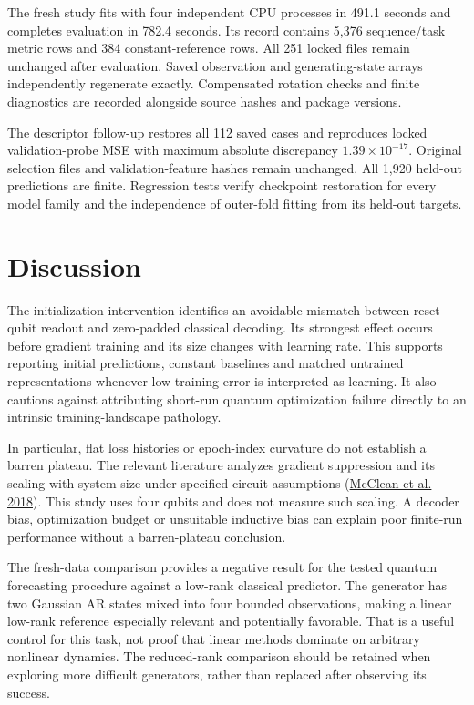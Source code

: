 \documentclass[
  11pt,
]{article}
\begin{document}
The fresh study fits with four independent CPU processes in 491.1
seconds and completes evaluation in 782.4 seconds. Its record contains
5,376 sequence/task metric rows and 384 constant-reference rows. All 251
locked files remain unchanged after evaluation. Saved observation and
generating-state arrays independently regenerate exactly. Compensated
rotation checks and finite diagnostics are recorded alongside source
hashes and package versions.

The descriptor follow-up restores all 112 saved cases and reproduces
locked validation-probe MSE with maximum absolute discrepancy
\(1.39\times10^{-17}\). Original selection files and validation-feature
hashes remain unchanged. All 1,920 held-out predictions are finite.
Regression tests verify checkpoint restoration for every model family
and the independence of outer-fold fitting from its held-out targets.

\hypertarget{discussion}{%
\section{Discussion}\label{discussion}}

The initialization intervention identifies an avoidable mismatch between
reset-qubit readout and zero-padded classical decoding. Its strongest
effect occurs before gradient training and its size changes with
learning rate. This supports reporting initial predictions, constant
baselines and matched untrained representations whenever low training
error is interpreted as learning. It also cautions against attributing
short-run quantum optimization failure directly to an intrinsic
training-landscape pathology.

In particular, flat loss histories or epoch-index curvature do not
establish a barren plateau. The relevant literature analyzes gradient
suppression and its scaling with system size under specified circuit
assumptions (\protect\hyperlink{ref-mcclean2018barren}{McClean et al.
2018}). This study uses four qubits and does not measure such scaling. A
decoder bias, optimization budget or unsuitable inductive bias can
explain poor finite-run performance without a barren-plateau conclusion.

The fresh-data comparison provides a negative result for the tested
quantum forecasting procedure against a low-rank classical predictor.
The generator has two Gaussian AR states mixed into four bounded
observations, making a linear low-rank reference especially relevant and
potentially favorable. That is a useful control for this task, not proof
that linear methods dominate on arbitrary nonlinear dynamics. The
reduced-rank comparison should be retained when exploring more difficult
generators, rather than replaced after observing its success.
\end{document}
